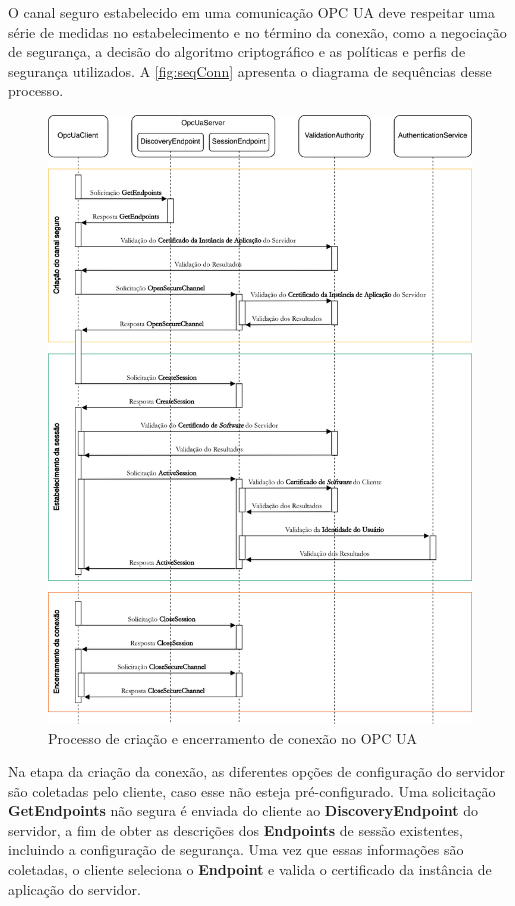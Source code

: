         O canal seguro estabelecido em uma comunicação OPC UA deve respeitar uma série de medidas no estabelecimento e no término da conexão, como a negociação de segurança, a decisão do algoritmo criptográfico e as políticas e perfis de segurança utilizados. A \autoref{fig:seqConn} apresenta o diagrama de sequências desse processo.

        \begin{figure}[htbp]
            \caption{Processo de criação e encerramento de conexão no OPC UA}
            \label{fig:seqConn}
            \begin{center}
                \includegraphics[width=0.972\linewidth]{USPSC-img/seqConn.png}
            \end{center}
        \end{figure}

        Na etapa da criação da conexão, as diferentes opções de configuração do servidor são coletadas pelo cliente, caso esse não esteja pré-configurado. Uma solicitação \textbf{GetEndpoints} não segura é enviada do cliente ao \textbf{DiscoveryEndpoint} do servidor, a fim de obter as descrições dos \textbf{Endpoints} de sessão existentes, incluindo a configuração de segurança. Uma vez que essas informações são coletadas, o cliente seleciona o \textbf{Endpoint} e valida o certificado da instância de aplicação do servidor. 
        
